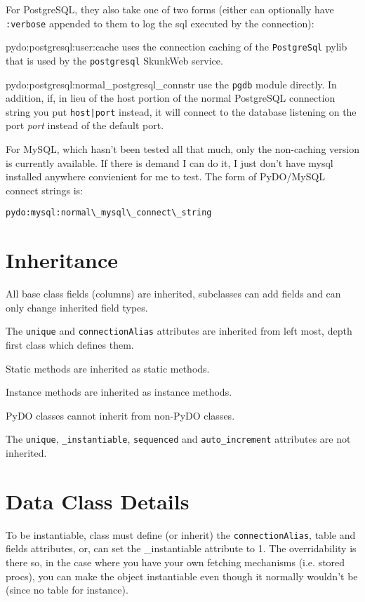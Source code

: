 \documentclass[titlepage]{manual}
\begin{document}
For PostgreSQL, they also take one of two forms (either can optionally
have \texttt{:verbose} appended to them to log the sql executed by the
connection): 
\begin{argdesc}
\item[pydo:postgresql:user:cache] uses the connection caching of the
\texttt{PostgreSql} pylib that is used by the \texttt{postgresql}
SkunkWeb service.
\item[pydo:postgresql:normal\_postgresql\_connstr] use the
\texttt{pgdb} module directly.  In addition, if, in lieu of the host
portion of the normal PostgreSQL connection string you put
\texttt{host|port} instead, it will connect to the database listening
on the port \emph{port} instead of the default port.
\end{argdesc}

For MySQL, which hasn't been tested all that much, only the non-caching
version is currently available.  If there is demand I can do it, I just
don't have mysql installed anywhere convienient for me to test.
The form of PyDO/MySQL connect strings is:
\begin{verbatim}
pydo:mysql:normal\_mysql\_connect\_string
\end{verbatim}

\section{Inheritance}
All base class fields (columns) are inherited, subclasses can add fields 
and can only change inherited field types.

The \texttt{unique} and \texttt{connectionAlias} attributes are
inherited from left most, depth first class which defines them.

Static methods are inherited as static methods.

Instance methods are inherited as instance methods.

PyDO classes cannot inherit from non-PyDO classes.

The \texttt{unique}, \texttt{_instantiable}, \texttt{sequenced} and
\texttt{auto_increment} attributes are not inherited.



\section{Data Class Details}
To be instantiable, class must define (or inherit) the
\texttt{connectionAlias}, table and fields attributes, or, can set the
_instantiable attribute to 1.  The overridability is there so, in the
case where you have your own fetching mechanisms (i.e. stored procs),
you can make the object instantiable even though it normally wouldn't
be (since no table for instance).
\end{document}

